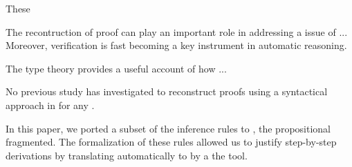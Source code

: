 \documentclass[../main.tex]{subfiles}
\begin{document}




 These

The recontruction of  proof can play an important role in addressing a issue
of ...
Moreover, verification is fast becoming a key instrument in automatic reasoning.

The type theory provides a useful account of how ...

No previous study has investigated to reconstruct proofs using a syntactical approach
in \Agda for any \ATPs.

In this paper, we ported a subset of the \Metis inference rules to
\Agda, the propositional fragmented. The formalization of
these rules allowed us to justify step-by-step \Metis derivations by
translating automatically to \Agda by a the \Athena tool.
\end{document}
